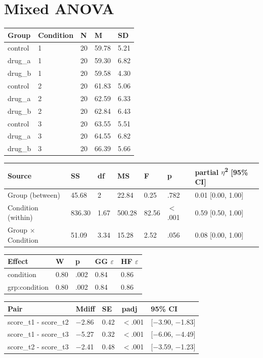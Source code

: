 \documentclass{article}
\begin{document}
\section{Mixed ANOVA}

\begin{tabular}{lllll}
\toprule
Group & Condition & N & M & SD \\
\midrule
control & 1 & 20 & 59.78 & 5.21 \\
drug\_a & 1 & 20 & 59.30 & 6.82 \\
drug\_b & 1 & 20 & 59.58 & 4.30 \\
control & 2 & 20 & 61.83 & 5.06 \\
drug\_a & 2 & 20 & 62.59 & 6.33 \\
drug\_b & 2 & 20 & 62.84 & 6.43 \\
control & 3 & 20 & 63.55 & 5.51 \\
drug\_a & 3 & 20 & 64.55 & 6.82 \\
drug\_b & 3 & 20 & 66.39 & 5.66 \\
\bottomrule
\end{tabular}

\begin{tabular}{lllllll}
\toprule
Source & SS & df & MS & F & p & partial $\eta$\textsuperscript{2} [95\% CI] \\
\midrule
Group (between) & 45.68 & 2 & 22.84 & 0.25 & .782 & 0.01 [0.00, 1.00] \\
Condition (within) & 836.30 & 1.67 & 500.28 & 82.56 & $<$.001 & 0.59 [0.50, 1.00] \\
Group $\times$ Condition & 51.09 & 3.34 & 15.28 & 2.52 & .056 & 0.08 [0.00, 1.00] \\
\bottomrule
\end{tabular}

\begin{tabular}{lllll}
\toprule
Effect & W & p & GG $\varepsilon$ & HF $\varepsilon$ \\
\midrule
condition & 0.80 & .002 & 0.84 & 0.86 \\
grp:condition & 0.80 & .002 & 0.84 & 0.86 \\
\bottomrule
\end{tabular}

\begin{tabular}{lllll}
\toprule
Pair & Mdiff & SE & padj & 95\% CI \\
\midrule
score\_t1 - score\_t2 & $-$2.86 & 0.42 & $<$.001 & [$-$3.90, $-$1.83] \\
score\_t1 - score\_t3 & $-$5.27 & 0.32 & $<$.001 & [$-$6.06, $-$4.49] \\
score\_t2 - score\_t3 & $-$2.41 & 0.48 & $<$.001 & [$-$3.59, $-$1.23] \\
\bottomrule
\end{tabular}
\end{document}
